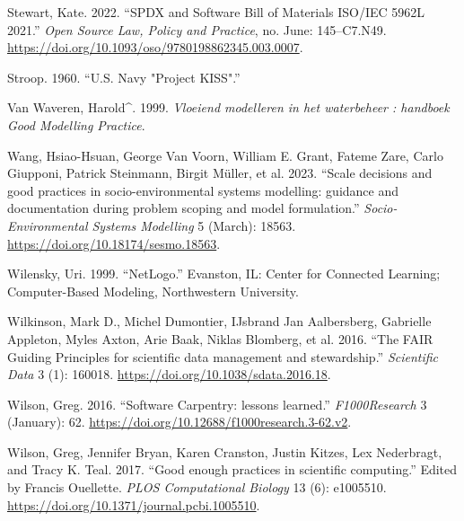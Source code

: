 \documentclass[preprint,11pt,5p]{elsarticle}
\newlength{\cslhangindent}
\newenvironment{CSLReferences}[2] %
{\begin{list}{}{%
	\setlength{\itemindent}{0pt}
	\setlength{\leftmargin}{0pt}
	\setlength{\parsep}{0pt}
	\ifodd #1
	\setlength{\leftmargin}{\cslhangindent}
	\setlength{\itemindent}{-1\cslhangindent}
	\fi
	\setlength{\itemsep}{#2\baselineskip}}}
{\end{list}}
\begin{document}
\begin{CSLReferences}{1}{0}
Stewart, Kate. 2022. {``{SPDX and Software Bill of Materials ISO/IEC
5962L 2021}.''} \emph{Open Source Law, Policy and Practice}, no. June:
145--C7.N49. \url{https://doi.org/10.1093/oso/9780198862345.003.0007}.

Stroop. 1960. {``{U.S. Navy "Project KISS"}.''}

Van Waveren, Harold\^{}. 1999. \emph{{Vloeiend modelleren in het
waterbeheer : handboek Good Modelling Practice}}.

Wang, Hsiao-Hsuan, George Van Voorn, William E. Grant, Fateme Zare,
Carlo Giupponi, Patrick Steinmann, Birgit Müller, et al. 2023. {``{Scale
decisions and good practices in socio-environmental systems modelling:
guidance and documentation during problem scoping and model
formulation}.''} \emph{Socio-Environmental Systems Modelling} 5 (March):
18563. \url{https://doi.org/10.18174/sesmo.18563}.

Wilensky, Uri. 1999. {``{NetLogo}.''} Evanston, IL: Center for Connected
Learning; Computer-Based Modeling, Northwestern University.

Wilkinson, Mark D., Michel Dumontier, IJsbrand Jan Aalbersberg,
Gabrielle Appleton, Myles Axton, Arie Baak, Niklas Blomberg, et al.
2016. {``{The FAIR Guiding Principles for scientific data management and
stewardship}.''} \emph{Scientific Data} 3 (1): 160018.
\url{https://doi.org/10.1038/sdata.2016.18}.

Wilson, Greg. 2016. {``{Software Carpentry: lessons learned}.''}
\emph{F1000Research} 3 (January): 62.
\url{https://doi.org/10.12688/f1000research.3-62.v2}.

Wilson, Greg, Jennifer Bryan, Karen Cranston, Justin Kitzes, Lex
Nederbragt, and Tracy K. Teal. 2017. {``{Good enough practices in
scientific computing}.''} Edited by Francis Ouellette. \emph{PLOS
Computational Biology} 13 (6): e1005510.
\url{https://doi.org/10.1371/journal.pcbi.1005510}.

\end{CSLReferences}
\end{document}
